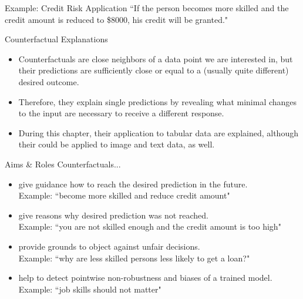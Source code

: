 \documentclass[11pt,compress,t,notes=noshow, xcolor=table]{beamer}
\begin{document}
\begin{vbframe}{Example: Credit Risk Application}
	``If the person becomes more skilled and the credit amount is reduced to \$8000, his credit will be granted."  \\[0.2cm]
	
\end{vbframe}

\begin{vbframe}{Counterfactual Explanations}
	\begin{itemize}
		\item Counterfactuals are close neighbors of a data point we are interested in, but their predictions are sufficiently close or equal to a (usually quite different) desired outcome. 
		\item Therefore, they explain single predictions by revealing what minimal changes to the input are necessary to receive a different response. 
		\item During this chapter, their application to tabular data are explained, although their could be applied to image and text data, as well. 
	\end{itemize}
\end{vbframe}

\begin{vbframe}{Aims \& Roles}
	Counterfactuals...
	\begin{itemize}
		\itemsep1.5em
		\item give guidance how to reach the desired prediction in the future.\\
		Example:  ``become more skilled and reduce credit amount"
		\item give reasons why desired prediction was not reached. \\
		Example:  ``you are not skilled enough and the credit amount is too high"
		\item provide grounds to object against unfair decisions. \\
		Example:  ``why are less skilled persons less likely to get a loan?"
		\item help to detect pointwise non-robustness and biases of a trained model. \\
		Example:  ``job skills should not matter" 
	\end{itemize}
\end{vbframe}
\end{document}
